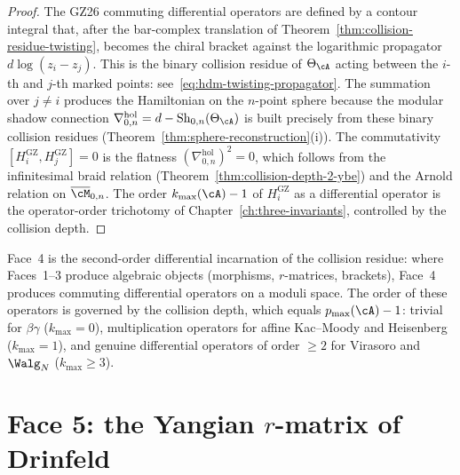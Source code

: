\begin{proof}
The GZ26 commuting differential operators are defined by a contour
integral that, after the bar-complex translation of
Theorem~\ref{thm:collision-residue-twisting}, becomes the chiral
bracket against the logarithmic propagator $d\log(z_i - z_j)$.
This is the binary collision residue of $\Theta_\cA$ acting between
the $i$-th and $j$-th marked points: see~\eqref{eq:hdm-twisting-propagator}.
The summation over $j \neq i$ produces the Hamiltonian on the
$n$-point sphere because the modular shadow connection
$\nabla^{\mathrm{hol}}_{0,n} = d - \mathrm{Sh}_{0,n}(\Theta_\cA)$
is built precisely from these binary collision residues
(Theorem~\ref{thm:sphere-reconstruction}(i)). The commutativity
$[H_i^{\mathrm{GZ}}, H_j^{\mathrm{GZ}}] = 0$ is the flatness
$(\nabla^{\mathrm{hol}}_{0,n})^2 = 0$, which follows from the
infinitesimal braid relation
(Theorem~\ref{thm:collision-depth-2-ybe}) and the Arnold relation
on $\overline{\cM}_{0,n}$. The order $k_{\max}(\cA) - 1$ of
$H_i^{\mathrm{GZ}}$ as a differential operator is the operator-order
trichotomy of Chapter~\ref{ch:three-invariants}, controlled by the
collision depth.
\end{proof}

Face~4 is the second-order differential incarnation of the
collision residue: where Faces~1--3 produce algebraic objects
(morphisms, $r$-matrices, brackets), Face~4 produces commuting
differential operators on a moduli space. The order of these
operators is governed by the collision depth, which equals
$p_{\max}(\cA) - 1$: trivial for $\beta\gamma$ ($k_{\max} = 0$),
multiplication operators for affine Kac--Moody and Heisenberg
($k_{\max} = 1$), and genuine differential operators of order
$\geq 2$ for Virasoro and $\Walg_N$ ($k_{\max} \geq 3$).

\section{Face 5: the Yangian $r$-matrix of Drinfeld}
\label{sec:hdm-face-5}

